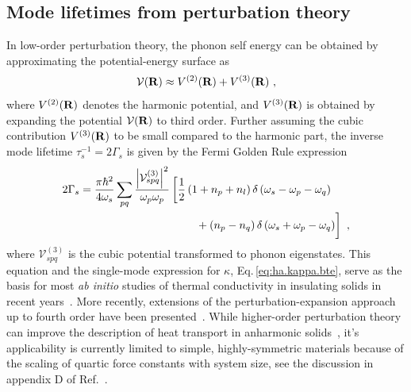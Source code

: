 \subsection{Mode lifetimes from perturbation theory}
In low-order perturbation theory, the phonon self energy can be obtained by approximating the potential-energy surface as
\begin{align}
	\mathcal{V} (\b R) \approx V^{(2)} (\b R) + V^{(3)} (\b R)~,
	\label{eq:V3}
\end{align}
where $V^{(2)} ({\bf R})$ denotes the harmonic potential, and $V^{(3)} ({\bf R})$ is obtained by expanding the potential $\mathcal V ({\bf R})$ to third order. Further assuming the cubic contribution $V^{(3)} ({\bf R})$ to be small compared to the harmonic part, the inverse mode lifetime $\tau_s^{-1} = 2 \Gamma_s$ is given by the Fermi Golden Rule expression~\cite{Fabian1996}
\begin{align}
\begin{split}
	2 \Gamma_{s}=\frac{\pi \hbar^{2}}{4 \omega_{s}} \sum_{pq} \frac{\left|\mathcal V^{(3)}_{spq}\right|^{2}}{\omega_{p} \omega_{p}}
		&\left[ 
	  \frac{1}{2}\left(1+n_{p}+n_{l}\right) \delta\left(\omega_{s}-\omega_{p}-\omega_{q}\right) \right. \\
		&\left.~~~~ \phantom{\halb} + \left(n_{p}-n_{q}\right) \delta\left(\omega_{s}+\omega_{p}-\omega_{q}\right)\right]~,
\end{split}
\end{align}
where $\mathcal V^{(3)}_{spq}$ is the cubic potential transformed to phonon eigenstates. This equation and the single-mode expression for $\kappa$, Eq.\,\eqref{eq:ha.kappa.bte}, serve as the basis for most \emph{ab initio} studies of thermal conductivity in insulating solids in recent years~\cite{Broido2007,Simoncelli2019,Isaeva2019}. More recently, extensions of the perturbation-expansion approach up to fourth order have been presented~\cite{Feng2016,Feng2017,Ravichandran2018,Xia2018}. While higher-order perturbation theory can improve the description of heat transport in anharmonic solids~\cite{Xia2020,Ravichandran2020}, it's applicability is currently limited to simple, highly-symmetric materials because of the scaling of quartic force constants with system size, see the discussion in appendix D of Ref.~\cite{Ravichandran2018}.

